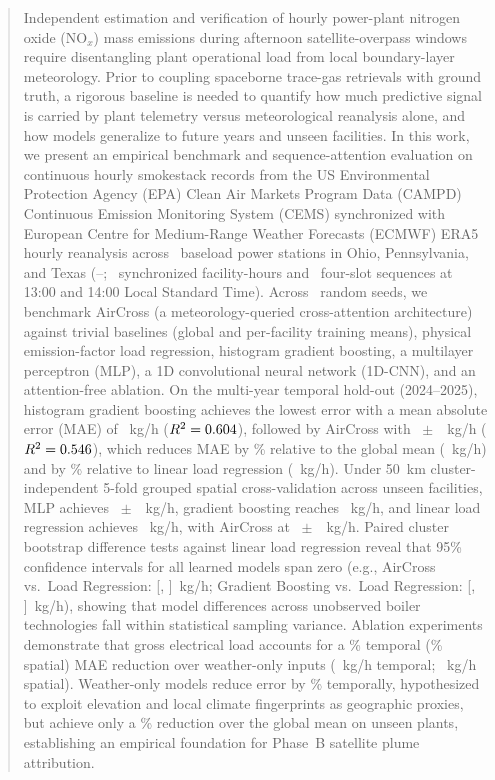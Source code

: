 \documentclass[conference]{IEEEtran}
\begin{document}
\begin{abstract}
Independent estimation and verification of hourly power-plant nitrogen oxide ($\text{NO}_x$) mass emissions during afternoon satellite-overpass windows require disentangling plant operational load from local boundary-layer meteorology. Prior to coupling spaceborne trace-gas retrievals with ground truth, a rigorous baseline is needed to quantify how much predictive signal is carried by plant telemetry versus meteorological reanalysis alone, and how models generalize to future years and unseen facilities. In this work, we present an empirical benchmark and sequence-attention evaluation on continuous hourly smokestack records from the US Environmental Protection Agency (EPA) Clean Air Markets Program Data (CAMPD) Continuous Emission Monitoring System (CEMS) synchronized with European Centre for Medium-Range Weather Forecasts (ECMWF) ERA5 hourly reanalysis across \NFacilities~baseload power stations in Ohio, Pennsylvania, and Texas (\YearFirst--\YearLast; \NFacilityHours~synchronized facility-hours and \NWindows~four-slot sequences at 13:00 and 14:00 Local Standard Time). Across \NSeeds~random seeds, we benchmark AirCross (a meteorology-queried cross-attention architecture) against trivial baselines (global and per-facility training means), physical emission-factor load regression, histogram gradient boosting, a multilayer perceptron (MLP), a 1D convolutional neural network (1D-CNN), and an attention-free ablation. On the multi-year temporal hold-out (2024--2025), histogram gradient boosting achieves the lowest error with a mean absolute error (MAE) of \TempGBMAE~kg/h ($R^2 = \TempGBR$), followed by AirCross with \TempAirCrossMAE~$\pm$~\TempAirCrossMAEsd~kg/h ($R^2 = \TempAirCrossR$), which reduces MAE by \TempAirCrossVsGlobalPct\% relative to the global mean (\TempGlobalMeanMAE~kg/h) and by \TempAirCrossVsLoadRegPct\% relative to linear load regression (\TempLoadRegMAE~kg/h). Under 50~km cluster-independent 5-fold grouped spatial cross-validation across unseen facilities, MLP achieves \SpatMLPMAE~$\pm$~\SpatMLPMAEsd~kg/h, gradient boosting reaches \SpatGBMAE~kg/h, and linear load regression achieves \SpatLoadRegMAE~kg/h, with AirCross at \SpatAirCrossMAE~$\pm$~\SpatAirCrossMAEsd~kg/h. Paired cluster bootstrap difference tests against linear load regression reveal that 95\% confidence intervals for all learned models span zero (e.g., AirCross vs.\ Load Regression: [\SpatAirCrossdCIlo, \SpatAirCrossdCIhi]~kg/h; Gradient Boosting vs.\ Load Regression: [\SpatGBdCIlo, \SpatGBdCIhi]~kg/h), showing that model differences across unobserved boiler technologies fall within statistical sampling variance. Ablation experiments demonstrate that gross electrical load accounts for a \TempLoadGainPct\% temporal (\SpatLoadGainPct\% spatial) MAE reduction over weather-only inputs (\TempAirCrossWMAE~kg/h temporal; \SpatAirCrossWMAE~kg/h spatial). Weather-only models reduce error by \TempWeatherOnlyVsGlobalPct\% temporally, hypothesized to exploit elevation and local climate fingerprints as geographic proxies, but achieve only a \SpatWeatherOnlyVsGlobalPct\% reduction over the global mean on unseen plants, establishing an empirical foundation for Phase~B satellite plume attribution.
\end{abstract}
\end{document}
